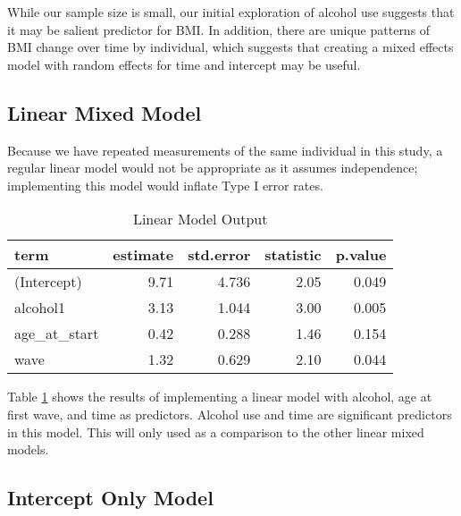 \documentclass[12pt, twoside]{amherstthesis}
\begin{document}
While our sample size is small, our initial exploration of alcohol use suggests that it may be salient predictor for BMI. In addition, there are unique patterns of BMI change over time by individual, which suggests that creating a mixed effects model with random effects for time and intercept may be useful.

\hypertarget{linear-mixed-model}{%
\subsection{Linear Mixed Model}\label{linear-mixed-model}}

Because we have repeated measurements of the same individual in this study, a regular linear model would not be appropriate as it assumes independence; implementing this model would inflate Type I error rates.
\begin{table}

\caption{\label{tab:lm}Linear Model Output}
\centering
\begin{tabular}[t]{l|r|r|r|r}
\hline
term & estimate & std.error & statistic & p.value\\
\hline
(Intercept) & 9.71 & 4.736 & 2.05 & 0.049\\
\hline
alcohol1 & 3.13 & 1.044 & 3.00 & 0.005\\
\hline
age\_at\_start & 0.42 & 0.288 & 1.46 & 0.154\\
\hline
wave & 1.32 & 0.629 & 2.10 & 0.044\\
\hline
\end{tabular}
\end{table}
Table \ref{tab:lm} shows the results of implementing a linear model with alcohol, age at first wave, and time as predictors. Alcohol use and time are significant predictors in this model. This will only used as a comparison to the other linear mixed models.

\hypertarget{intercept-only-model}{%
\subsection{Intercept Only Model}\label{intercept-only-model}}
\end{document}
